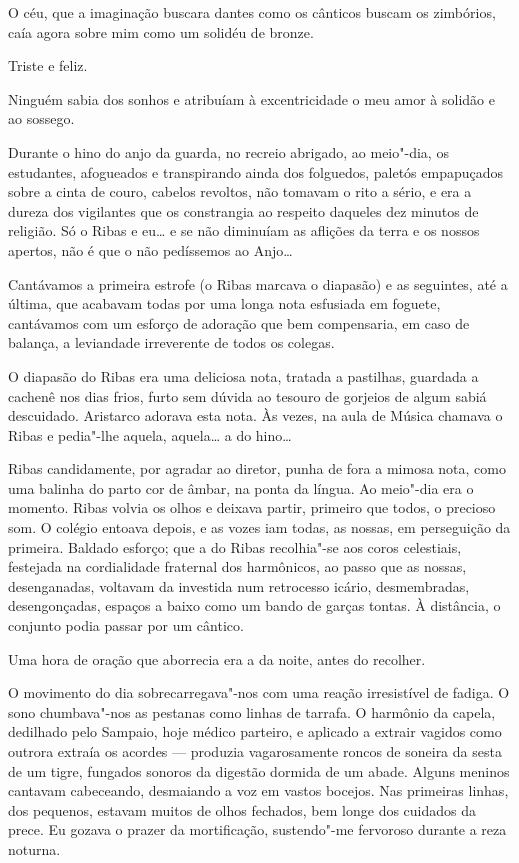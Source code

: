 O céu, que a imaginação buscara dantes como os cânticos
buscam os zimbórios, caía agora sobre mim como um solidéu de bronze.

Triste e feliz. 

Ninguém sabia dos sonhos e atribuíam à excentricidade o
meu amor à solidão e ao sossego. 

Durante o hino do anjo da guarda, no
recreio abrigado, ao meio"-dia, os estudantes, afogueados e
transpirando ainda dos folguedos, paletós empapuçados sobre a cinta
de couro, cabelos revoltos, não tomavam o rito a sério, e era a dureza
dos vigilantes que os constrangia ao respeito daqueles dez minutos de
religião. Só o Ribas e eu\ldots{} e se não diminuíam as aflições da terra e
os nossos apertos, não é que o não pedíssemos ao Anjo\ldots{} 

Cantávamos a
primeira estrofe (o Ribas marcava o diapasão) e as seguintes, até a
última, que acabavam todas por uma longa nota esfusiada em foguete,
cantávamos com um esforço de adoração que bem compensaria, em caso de
balança, a leviandade irreverente de todos os colegas. 

O diapasão do Ribas era uma deliciosa nota, tratada a pastilhas, guardada a
cachenê nos dias frios, furto sem dúvida ao tesouro de gorjeios de
algum sabiá descuidado. Aristarco adorava esta nota. Às vezes, na aula
de Música chamava o Ribas e pedia"-lhe aquela, aquela\ldots{} a do hino\ldots{}

Ribas candidamente, por agradar ao diretor, punha de fora a mimosa
nota, como uma balinha do parto cor de âmbar, na ponta da língua. Ao
meio"-dia era o momento. Ribas volvia os olhos e deixava partir,
primeiro que todos, o precioso som. O colégio entoava depois, e as
vozes iam todas, as nossas, em perseguição da primeira. Baldado
esforço; que a do Ribas recolhia"-se aos coros celestiais, festejada
na cordialidade fraternal dos harmônicos, ao passo que as nossas,
desenganadas, voltavam da investida num retrocesso icário,
desmembradas, desengonçadas, espaços a baixo como um bando de garças
tontas. À distância, o conjunto podia passar por um cântico. 

Uma hora de oração que aborrecia era a da noite, antes do recolher. 

O movimento do dia sobrecarregava"-nos com uma reação irresistível de fadiga. 
O sono chumbava"-nos as pestanas como linhas de tarrafa. O harmônio da
capela, dedilhado pelo Sampaio, hoje médico parteiro, e aplicado a
extrair vagidos como outrora extraía os acordes --- produzia
vagarosamente roncos de soneira da sesta de um tigre, fungados sonoros
da digestão dormida de um abade. Alguns meninos cantavam cabeceando,
desmaiando a voz em vastos bocejos. Nas primeiras linhas, dos pequenos,
estavam muitos de olhos fechados, bem longe dos cuidados da prece. Eu
gozava o prazer da mortificação, sustendo"-me fervoroso durante a reza
noturna. 

